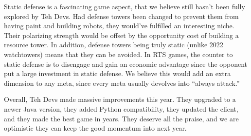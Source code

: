 \medskip

Static defense is a fascinating game aspect, that we believe still hasn't been fully explored by Teh Devs. Had defense towers been changed to prevent them from having paint and building robots, they would've fulfilled an interesting niche. Their polarizing strength would be offset by the opportunity cost of building a resource tower. In addition, defense towers being truly static (unlike 2022 watchtowers) means that they can be avoided. In RTS games, the counter to static defense is to disengage and gain an economic advantage since the opponent put a large investment in static defense. We believe this would add an extra dimension to any meta, since every meta usually devolves into ``always attack.''

\medskip

Overall, Teh Devs made massive improvements this year. They upgraded to a newer Java version, they added Python compatibility, they updated the client, and they made the best game in years. They deserve all the praise, and we are optimistic they can keep the good momentum into next year.